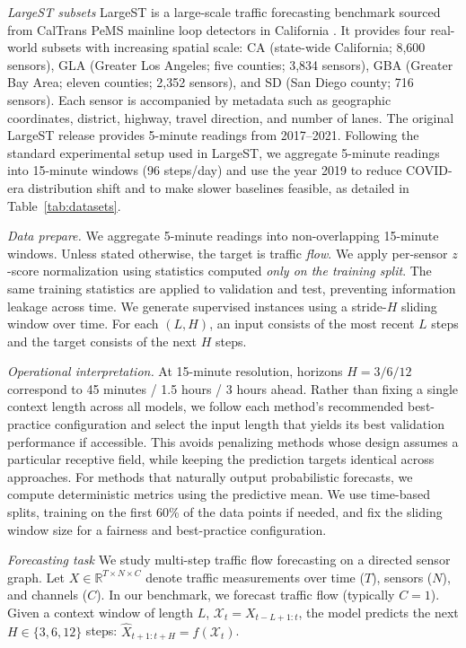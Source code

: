 \documentclass[10pt]{article}
\begin{document}
\textit{LargeST subsets}
LargeST is a large-scale traffic forecasting benchmark sourced from CalTrans PeMS mainline loop
detectors in California \citep{liu2023largest}. It provides four real-world subsets with increasing spatial
scale: {CA} (state-wide California; 8,600 sensors), {GLA} (Greater Los Angeles; five counties; 3,834 sensors),
{GBA} (Greater Bay Area; eleven counties; 2,352 sensors), and {SD} (San Diego county; 716 sensors). Each sensor is
accompanied by metadata such as geographic coordinates, district, highway, travel direction, and number
of lanes.
The original LargeST release provides 5-minute readings from 2017--2021. Following
the standard experimental setup used in LargeST, we aggregate 5-minute readings into {15-minute}
windows (96 steps/day) and use {the year 2019} to reduce COVID-era distribution shift and to make
slower baselines feasible, as detailed in Table~\ref{tab:datasets}. 


\textit{Data prepare.}
We aggregate 5-minute readings into non-overlapping 15-minute windows. Unless stated otherwise, the
target is traffic \emph{flow}. We apply per-sensor $z$-score normalization using statistics computed \emph{only on the training split}.
The same training statistics are applied to validation and test, preventing information leakage across
time. We generate supervised instances using a stride-$H$ sliding window over time. For each $(L,H)$, an input
consists of the most recent $L$ steps and the target consists of the next $H$ steps.




\textit{Operational interpretation.}
At 15-minute resolution, horizons $H=3/6/12$ correspond to 45 minutes / 1.5 hours / 3 hours
ahead. Rather than fixing a single context length across all models, we follow each method's recommended best-practice configuration and select the input length that yields its best validation performance if accessible. This avoids penalizing methods whose design assumes a particular receptive field, while keeping the prediction targets identical across approaches. For methods that naturally output probabilistic forecasts, we compute deterministic metrics using the predictive mean. We use time-based splits, training on the first 60\% of the data points if needed, and fix the sliding window size for a fairness and best-practice configuration.


\textit{Forecasting task}
We study multi-step traffic flow forecasting on a directed sensor graph. Let
$X \in \mathbb{R}^{T \times N \times C}$ denote traffic measurements over time ($T$), sensors ($N$), and
channels ($C$). In our benchmark, we forecast {traffic flow} (typically $C=1$).
Given a context window of length $L$,
$\mathcal{X}_{t} = X_{t-L+1:t}$, the model predicts the next $H \in \{3, 6, 12\}$ steps:
$\hat{X}_{t+1:t+H} = f(\mathcal{X}_{t})$.
\end{document}
